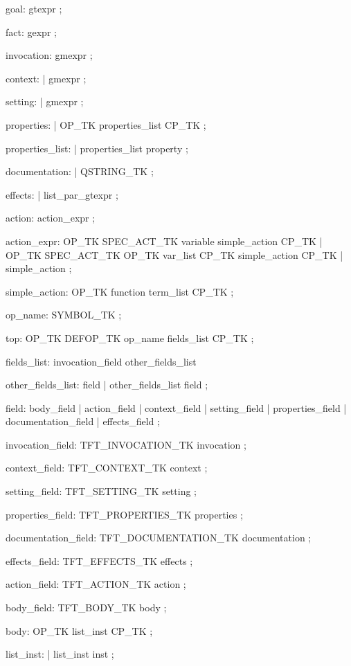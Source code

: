 goal:
        gtexpr
        ;

fact:
        gexpr
        ;

invocation:
            gmexpr
            ;

context:
        |
          gmexpr
        ;

setting:
        |
          gmexpr
        ;

properties:
        | OP_TK properties_list CP_TK
        ;

properties_list:
         | properties_list property
        ;

documentation:
        | QSTRING_TK
        ;

effects:
        | list_par_gtexpr
        ;

action:
            action_expr
        ;

action_expr:
        OP_TK SPEC_ACT_TK  variable
                simple_action CP_TK
        | OP_TK SPEC_ACT_TK  OP_TK var_list CP_TK
                simple_action CP_TK
        | simple_action
;

simple_action:
        OP_TK   function
                term_list CP_TK
;

op_name:
        SYMBOL_TK
        ;


top: OP_TK DEFOP_TK op_name
               fields_list
        CP_TK
;

fields_list: invocation_field other_fields_list

other_fields_list: field
           | other_fields_list field
;

field: body_field
     | action_field
     | context_field
     | setting_field
     | properties_field
     | documentation_field
     | effects_field
;

invocation_field: TFT_INVOCATION_TK invocation
;

context_field: TFT_CONTEXT_TK context
;

setting_field: TFT_SETTING_TK setting
;

properties_field: TFT_PROPERTIES_TK properties
;

documentation_field: TFT_DOCUMENTATION_TK documentation
;

effects_field: TFT_EFFECTS_TK effects
;

action_field: TFT_ACTION_TK action
;

body_field: TFT_BODY_TK  body
;

body: OP_TK list_inst CP_TK
;

list_inst:
         | list_inst inst
;

